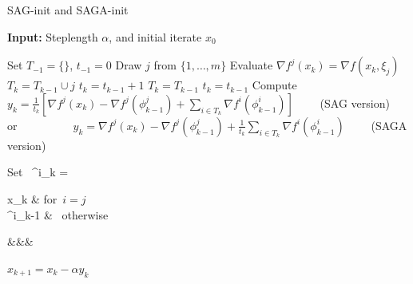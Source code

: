 \documentclass[11pt]{article}
\begin{document}
\bigskip
\begin{algorithm}
	[H] 
	\caption{SAG-init and SAGA-init}
	\label{alg:sagInit}
	{\bf Input:} Steplength $ \alpha $, and initial iterate $x_0$
	\begin{algorithmic}
		[1] 
		\State Set $T_{-1} = \{\}$, $t_{-1} = 0$ 
		\State Draw $j$ from $\{ 1, \ldots ,m\}$ 
		\State Evaluate $\nabla f^j(x_k) = \nabla f(x_k, \xi_j) $
		\State $T_{k} = T_{k-1} \cup  j$
		\State $t_{k}=t_{k-1}+1$
		\Else
		\State $T_{k} = T_{k-1}$
		\State $t_{k}=t_{k-1}$
		\EndIf 
           \State Compute $y_k =  \frac{1}{t_k} \left[ \nabla f^j(x_k) -  \nabla f^j(\phi_{k-1}^j) + \sum_{i \in T_k}  \nabla f^i (\phi^i_{k-1}) \right]\qquad$  (SAG version)
           \State or~~~~~~~~~~$y_k = \nabla f^j(x_k) -  \nabla f^j(\phi_{k-1}^j) +  \frac{1}{t_k} \sum_{i \in T_k}  \nabla f^i (\phi^i_{k-1})\qquad$ (SAGA version)
		\State \begin{flalign}   \mbox{Set   }  \phi^i_k =
		\begin{cases} 
  x_k & \mbox{for $i =j$ } \\
  \phi^i_{k-1} & \mbox{ otherwise} 
 \end{cases}&&&
\end{flalign}
		\State $x_{k+1} = x_k - \alpha y_k$ 
		\EndLoop 
	\end{algorithmic}
\end{algorithm}


\end{document}
